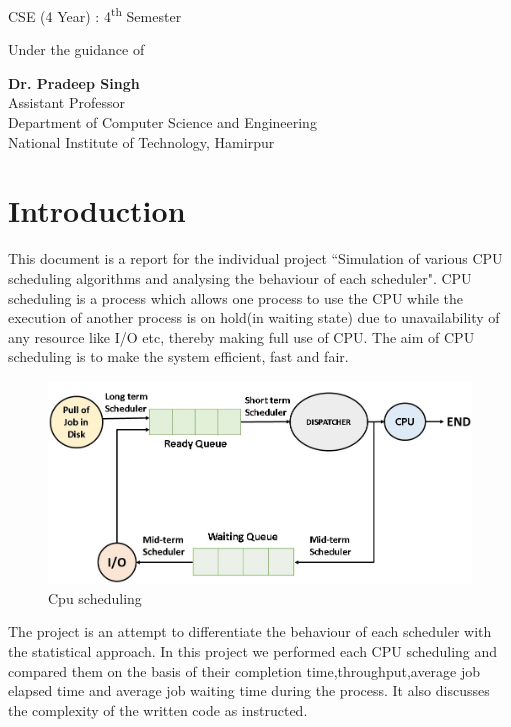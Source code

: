 \documentclass[11pt,a4paper]{report}
\begin{document}
\begin{titlepage}
\begin{center}
        \vspace{15pt}
        CSE (4 Year) : 
        4\textsuperscript{th} Semester
 
        \vspace{2cm}
 
        Under the guidance of
        
        \vspace{0.5cm}
        
        \textbf{Dr. Pradeep Singh }\\
		\large
		Assistant Professor\\ Department of Computer Science and Engineering\\
        National Institute of Technology, Hamirpur\\
      
    \end{center}
\end{titlepage}
		\section*{Introduction}
		\vskip 1cm
		This document is a report for the individual project ``Simulation of various CPU scheduling algorithms and analysing the behaviour of each scheduler". CPU scheduling is a process which allows one process to use the CPU while the execution of another process is on hold(in waiting state) due to unavailability of any resource like I/O etc, thereby making full use of CPU. The aim of CPU scheduling is to make the system efficient, fast and fair.\\ 
		\vskip 1cm
		\begin{figure}[H]
		\centering
		\includegraphics[scale=0.5]{cpu.jpg}
		\caption{Cpu scheduling}
		\end{figure}
		\vskip 1cm

		The project is an attempt to differentiate the behaviour of each scheduler with the statistical approach. In this project we performed each CPU scheduling and compared them on the basis of their completion time,throughput,average job elapsed time and average job waiting time during the process. It also discusses the complexity of the written code as instructed.
		\pagebreak
\end{document}
